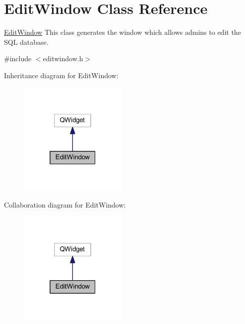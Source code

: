\hypertarget{class_edit_window}{}\section{Edit\+Window Class Reference}
\label{class_edit_window}


\mbox{\hyperlink{class_edit_window}{Edit\+Window}} This class generates the window which allows admins to edit the S\+QL database.  




{\ttfamily \#include $<$editwindow.\+h$>$}



Inheritance diagram for Edit\+Window\+:\nopagebreak
\begin{figure}[H]
\begin{center}
\leavevmode
\includegraphics[width=148pt]{class_edit_window__inherit__graph}
\end{center}
\end{figure}


Collaboration diagram for Edit\+Window\+:\nopagebreak
\begin{figure}[H]
\begin{center}
\leavevmode
\includegraphics[width=148pt]{class_edit_window__coll__graph}
\end{center}
\end{figure}
